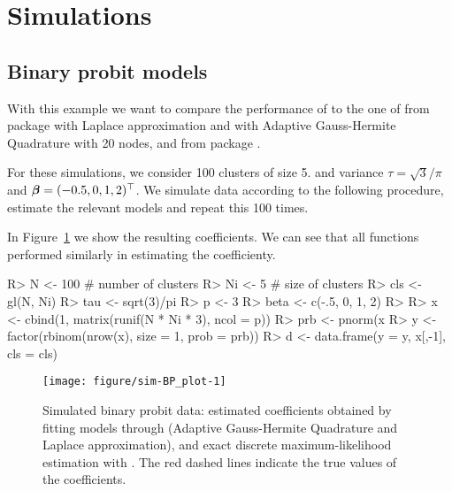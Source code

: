 \documentclass[article,nojss,shortnames]{jss}\usepackage[]{graphicx}\usepackage[]{xcolor}
\newcommand{\shiftparm}{\betavec}
\def \betavec         {\text{\boldmath$\beta$}}
\begin{document}


\newpage

\appendix

\section{Simulations}




\subsection{Binary probit models}

With this example we want to compare the performance of  to the
one of  from package  with Laplace approximation and with
Adaptive Gauss-Hermite Quadrature with 20 nodes, and  from package
 \citep{pkg:glmmTMB}. 

For these simulations, we consider 100 clusters of size 5.
and variance $\tau = \sqrt{3}/\pi$ and $\shiftparm = (-0.5, 0, 1, 2)^\top$.
We simulate data according to the following procedure, estimate the
relevant models and repeat this 100 times.

In Figure~\ref{fig:sim-BP} we show the resulting coefficients. We can see that
all functions performed similarly in estimating the coefficienty.

\begin{Schunk}
\begin{Sinput}
R> N <- 100 # number of clusters
R> Ni <- 5  # size of clusters
R> cls <- gl(N, Ni)
R> tau <- sqrt(3)/pi
R> p <- 3
R> beta <- c(-.5, 0, 1, 2)
R> 
R> x <- cbind(1, matrix(runif(N * Ni * 3), ncol = p))
R> prb <- pnorm(x %*% beta + rnorm(N, sd = tau)[cls])
R> y <- factor(rbinom(nrow(x), size = 1, prob = prb))
R> d <- data.frame(y = y, x[,-1], cls = cls)
\end{Sinput}
\end{Schunk}




\begin{figure}[t]
\begin{Schunk}


{\centering \texttt{[image: figure/sim-BP\_plot-1]} 

}

\end{Schunk}
\caption{Simulated binary probit data: estimated coefficients obtained by
fitting models through 
(Adaptive Gauss-Hermite Quadrature and Laplace approximation),  and
exact discrete maximum-likelihood estimation with .
The red dashed lines indicate the true values of the coefficients.
\label{fig:sim-BP}}
\end{figure}
\end{document}
